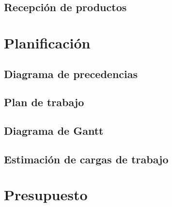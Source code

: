 \subsection{Recepción de productos}

\section{Planificación}

\subsection{Diagrama de precedencias}

\subsection{Plan de trabajo}

\subsection{Diagrama de Gantt}

\subsection{Estimación de cargas de trabajo}

\section{Presupuesto}